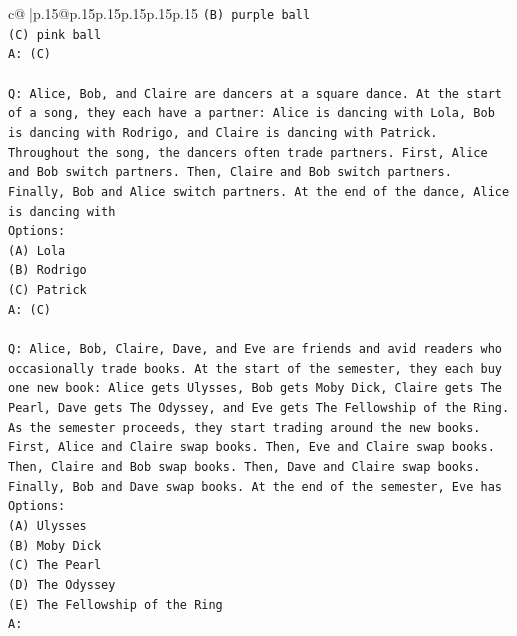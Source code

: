 \documentclass{article}
\begin{document}
{\begin{supertabular}{c@{$\;$}|p{.15\linewidth}@{}p{.15\linewidth}p{.15\linewidth}p{.15\linewidth}p{.15\linewidth}p{.15\linewidth}}
{{{\texttt{(B) purple ball} \\
\texttt{(C) pink ball} \\
\texttt{A: (C)} \\
\\ 
\texttt{Q: Alice, Bob, and Claire are dancers at a square dance. At the start of a song, they each have a partner: Alice is dancing with Lola, Bob is dancing with Rodrigo, and Claire is dancing with Patrick.} \\
\texttt{Throughout the song, the dancers often trade partners. First, Alice and Bob switch partners. Then, Claire and Bob switch partners. Finally, Bob and Alice switch partners. At the end of the dance, Alice is dancing with} \\
\texttt{Options:} \\
\texttt{(A) Lola} \\
\texttt{(B) Rodrigo} \\
\texttt{(C) Patrick} \\
\texttt{A: (C)} \\
\\ 
\texttt{Q: Alice, Bob, Claire, Dave, and Eve are friends and avid readers who occasionally trade books. At the start of the semester, they each buy one new book: Alice gets Ulysses, Bob gets Moby Dick, Claire gets The Pearl, Dave gets The Odyssey, and Eve gets The Fellowship of the Ring.} \\
\texttt{As the semester proceeds, they start trading around the new books. First, Alice and Claire swap books. Then, Eve and Claire swap books. Then, Claire and Bob swap books. Then, Dave and Claire swap books. Finally, Bob and Dave swap books. At the end of the semester, Eve has} \\
\texttt{Options:} \\
\texttt{(A) Ulysses} \\
\texttt{(B) Moby Dick} \\
\texttt{(C) The Pearl} \\
\texttt{(D) The Odyssey} \\
\texttt{(E) The Fellowship of the Ring} \\
\texttt{A:} \\
            }
        }
    }
     \\ \\


\end{supertabular}}
\end{document}
